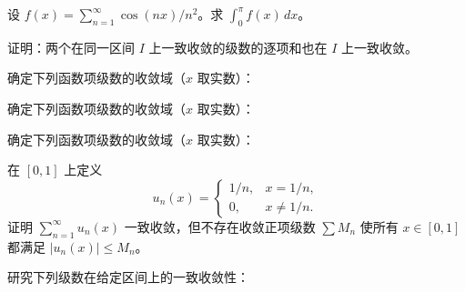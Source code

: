 \noindent\begin{minipage}{\textwidth}
设 $f(x)=\sum_{n=1}^{\infty}\cos(nx)/n^2$。求 $\int_0^\pi f(x)\,dx$。
\end{minipage}\par\vfill
\noindent\begin{minipage}{\textwidth}
证明：两个在同一区间 $I$ 上一致收敛的级数的逐项和也在 $I$ 上一致收敛。
\end{minipage}\par\vfill
\newpage
\noindent\begin{minipage}{\textwidth}
确定下列函数项级数的收敛域（$x$ 取实数）：
\end{minipage}\par\vfill
\noindent\begin{minipage}{\textwidth}
确定下列函数项级数的收敛域（$x$ 取实数）：
\end{minipage}\par\vfill
\noindent\begin{minipage}{\textwidth}
确定下列函数项级数的收敛域（$x$ 取实数）：
\end{minipage}\par\vfill
\noindent\begin{minipage}{\textwidth}
在 $[0,1]$ 上定义\[u_n(x)=\begin{cases}1/n,&x=1/n,\\0,&x\ne1/n.\end{cases}\]证明 $\sum_{n=1}^{\infty}u_n(x)$ 一致收敛，但不存在收敛正项级数 $\sum M_n$ 使所有 $x\in[0,1]$ 都满足 $|u_n(x)|\le M_n$。
\end{minipage}\par\vfill
\newpage
\noindent\begin{minipage}{\textwidth}
研究下列级数在给定区间上的一致收敛性：
\end{minipage}\par\vfill
